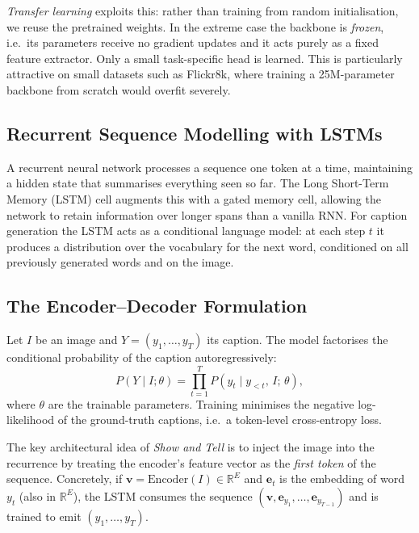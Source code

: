 \documentclass{article}
\begin{document}
\emph{Transfer learning} exploits this: rather than training from random
initialisation, we reuse the pretrained weights. In the extreme case the
backbone is \emph{frozen}, i.e.\ its parameters receive no gradient updates and
it acts purely as a fixed feature extractor. Only a small task-specific head is
learned. This is particularly attractive on small datasets such as Flickr8k,
where training a 25M-parameter backbone from scratch would overfit severely.

\subsection{Recurrent Sequence Modelling with LSTMs}

A recurrent neural network processes a sequence one token at a time, maintaining
a hidden state that summarises everything seen so far. The Long Short-Term
Memory (LSTM) cell \citep{hochreiter1997long} augments this with a gated memory
cell, allowing the network to retain information over longer spans than a vanilla
RNN. For caption generation the LSTM acts as a conditional language model: at
each step $t$ it produces a distribution over the vocabulary for the next word,
conditioned on all previously generated words and on the image.

\subsection{The Encoder--Decoder Formulation}

Let $I$ be an image and $Y = (y_1, \dots, y_T)$ its caption. The model factorises
the conditional probability of the caption autoregressively:
\begin{equation}
  P(Y \mid I; \theta) = \prod_{t=1}^{T} P\!\left(y_t \mid y_{<t},\, I;\, \theta\right),
\end{equation}
where $\theta$ are the trainable parameters. Training minimises the negative
log-likelihood of the ground-truth captions, i.e.\ a token-level cross-entropy
loss.

The key architectural idea of \emph{Show and Tell} \citep{vinyals2015show} is to
inject the image into the recurrence by treating the encoder's feature vector as
the \emph{first token} of the sequence. Concretely, if
$\mathbf{v} = \mathrm{Encoder}(I) \in \mathbb{R}^{E}$ and $\mathbf{e}_t$ is the
embedding of word $y_t$ (also in $\mathbb{R}^E$), the LSTM consumes the sequence
$(\mathbf{v}, \mathbf{e}_{y_1}, \dots, \mathbf{e}_{y_{T-1}})$ and is trained to
emit $(y_1, \dots, y_T)$.
\end{document}
